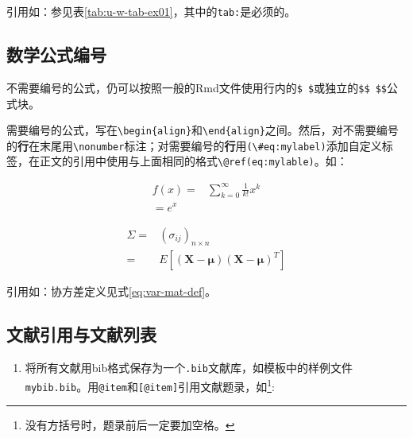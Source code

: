 \documentclass[]{article}
\providecommand{\tightlist}{%
  \setlength{\itemsep}{0pt}\setlength{\parskip}{0pt}}
\let\rmarkdownfootnote\footnote%
\def\footnote{\protect\rmarkdownfootnote}
\begin{document}
引用如：参见表\ref{tab:u-w-tab-ex01}，其中的\texttt{tab:}是必须的。

\hypertarget{usage-writing-math}{%
\subsection{数学公式编号}\label{usage-writing-math}}

不需要编号的公式，仍可以按照一般的Rmd文件使用行内的\texttt{\$\ \$}或独立的\texttt{\$\$\ \$\$}公式块。

需要编号的公式，写在\texttt{\textbackslash{}begin\{align\}}和\texttt{\textbackslash{}end\{align\}}之间。然后，对不需要编号的\textbf{行}在末尾用\texttt{\textbackslash{}nonumber}标注；对需要编号的\textbf{行}用\texttt{(\textbackslash{}\#eq:mylabel)}添加自定义标签，在正文的引用中使用与上面相同的格式\texttt{\textbackslash{}@ref(eq:mylable)}。如：

\begin{align}
f(x) =& \sum_{k=0}^\infty \frac{1}{k!} x^k \label{eq:efunc-sum} \\
  = e^x \label{eq:efunc-ex}
\end{align}

\begin{align}
\Sigma =&  (\sigma_{ij})_{n\times n} \nonumber \\
=& E[(\boldsymbol{X} - \boldsymbol{\mu}) (\boldsymbol{X} - \boldsymbol{\mu})^T ] \label{eq:var-mat-def}
\end{align}

引用如：协方差定义见式\eqref{eq:var-mat-def}。

\hypertarget{section-28}{%
\subsection{文献引用与文献列表}\label{section-28}}

\begin{enumerate}
\def\labelenumi{\arabic{enumi}.}
\tightlist
\item
  将所有文献用bib格式保存为一个\texttt{.bib}文献库，如模板中的样例文件\texttt{mybib.bib}。用\texttt{@item}和\texttt{{[}@item{]}}引用文献题录，如\footnote{没有方括号时，题录前后一定要加空格。}:
\end{enumerate}
\end{document}
